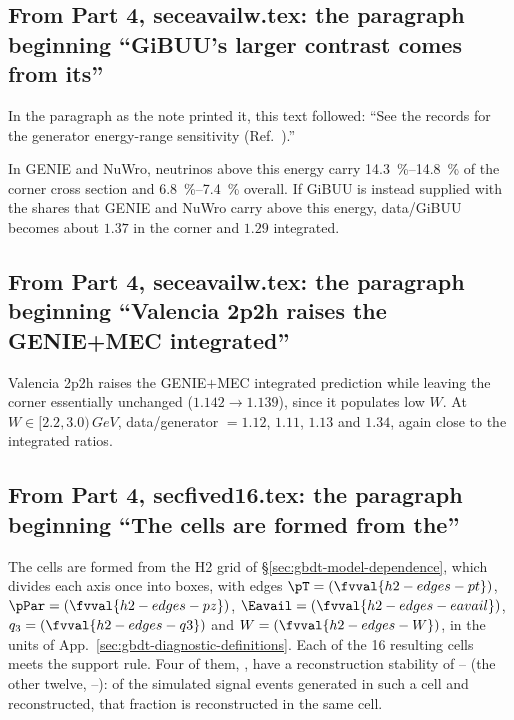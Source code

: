 \subsection{From Part 4, seceavailw.tex: the paragraph beginning ``GiBUU's larger contrast comes from its''}
In the paragraph as the note printed it, this text followed: ``See the records for the generator energy-range sensitivity (Ref.~\cite{NoteRecords2026}).''\par
In GENIE and NuWro, neutrinos above this energy carry \SIrange{14.3}{14.8}{\percent} of the corner cross section and \SIrange{6.8}{7.4}{\percent} overall. If GiBUU is instead supplied with the shares that GENIE and NuWro carry above this energy, data/GiBUU becomes about $1.37$ in the corner and $1.29$ integrated.

\subsection{From Part 4, seceavailw.tex: the paragraph beginning ``Valencia 2p2h raises the GENIE+MEC integrated''}
Valencia 2p2h raises the GENIE$+$MEC integrated prediction while leaving the corner essentially unchanged ($1.142\to1.139$), since it populates low $W$. At $W\in[2.2,3.0)\,\si{GeV}$, data/generator $=1.12$, $1.11$, $1.13$ and $1.34$, again close to the integrated ratios.

\subsection{From Part 4, secfived16.tex: the paragraph beginning ``The cells are formed from the''}
The cells are formed from the H2 grid of \S\ref{sec:gbdt-model-dependence}, which divides each axis once into  boxes, with edges $\pT=(\fvval{h2-edges-pt})$, $\pPar=(\fvval{h2-edges-pz})$, $\Eavail=(\fvval{h2-edges-eavail})$, $q_3=(\fvval{h2-edges-q3})$ and $W=(\fvval{h2-edges-W})$, in the units of App.~\ref{sec:gbdt-diagnostic-definitions}. Each of the 16 resulting cells meets the support rule. Four of them, , have a reconstruction stability of -- (the other twelve, --): of the simulated signal events generated in such a cell and reconstructed, that fraction is reconstructed in the same cell.

